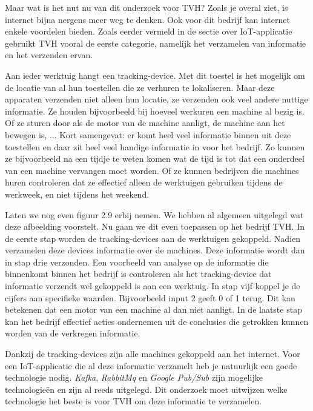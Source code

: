 Maar wat is het nut nu van dit onderzoek voor TVH? Zoals je overal ziet, is internet bijna nergens meer weg te denken. Ook voor dit bedrijf kan internet enkele voordelen bieden. Zoals eerder vermeld in de sectie over IoT-applicatie gebruikt TVH vooral de eerste categorie, namelijk het verzamelen van informatie en het verzenden ervan.

Aan ieder werktuig hangt een tracking-device. Met dit toestel is het mogelijk om de locatie van al hun toestellen die ze verhuren te lokaliseren. Maar deze apparaten verzenden niet alleen hun locatie, ze verzenden ook veel andere nuttige informatie. Ze houden bijvoorbeeld bij hoeveel werkuren een machine al bezig is. Of ze sturen door als de motor van de machine aanligt, de machine aan het bewegen is, ... Kort samengevat: er komt heel veel informatie binnen uit deze toestellen en daar zit heel veel handige informatie in voor het bedrijf. Zo kunnen ze bijvoorbeeld na een tijdje te weten komen wat de tijd is tot dat een onderdeel van een machine vervangen moet worden. Of ze kunnen bedrijven die machines huren controleren dat ze effectief alleen de werktuigen gebruiken tijdens de werkweek, en niet tijdens het weekend.

Laten we nog even figuur 2.9 erbij nemen. We hebben al algemeen uitgelegd wat deze afbeelding voorstelt. Nu gaan we dit even toepassen op het bedrijf TVH. In de eerste stap worden de tracking-devices aan de werktuigen gekoppeld. Nadien verzamelen deze devices informatie over de machines. Deze informatie wordt dan in stap drie verzonden. Een voorbeeld van analyse op de informatie die binnenkomt binnen het bedrijf is controleren als het tracking-device dat informatie verzendt wel gekoppeld is aan een werktuig. In stap vijf koppel je de cijfers aan specifieke waarden. Bijvoorbeeld input 2 geeft 0 of 1 terug. Dit kan betekenen dat een motor van een machine al dan niet aanligt. In de laatste stap kan het bedrijf effectief acties ondernemen uit de conclusies die getrokken kunnen worden van de verkregen informatie.

Dankzij de tracking-devices zijn alle machines gekoppeld aan het internet. Voor een IoT-applicatie die al deze informatie verzamelt heb je natuurlijk een goede technologie nodig. \emph{Kafka}, \emph{RabbitMq} en \emph{Google Pub/Sub} zijn mogelijke technologieën en zijn al reeds uitgelegd. Dit onderzoek moet uitwijzen welke technologie het beste is voor TVH om deze informatie te verzamelen.



